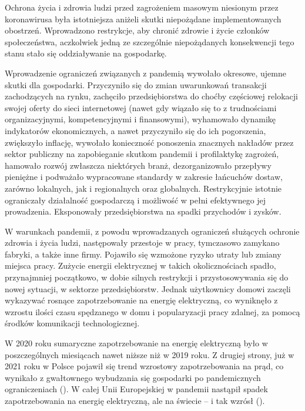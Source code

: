 \documentclass[polish, twoside, 12pt, a4paper]{article}
\theoremstyle{definition}
\theoremstyle{plain}
\theoremstyle{remark}
\begin{document}
Ochrona życia i zdrowia ludzi przed zagrożeniem masowym niesionym przez koronawirusa była istotniejsza aniżeli skutki niepożądane implementowanych obostrzeń. Wprowadzono restrykcje, aby chronić zdrowie i życie członków społeczeństwa, aczkolwiek jedną ze szczególnie niepożądanych konsekwencji tego stanu stało się oddziaływanie na gospodarkę.  

Wprowadzenie ograniczeń związanych z pandemią wywołało okresowe, ujemne skutki dla gospodarki. Przyczyniło się do zmian uwarunkowań transakcji zachodzących na rynku, zachęciło przedsiębiorstwa do choćby częściowej relokacji swojej oferty do sieci internetowej (nawet gdy wiązało się to z trudnościami organizacyjnymi, kompetencyjnymi i finansowymi), wyhamowało dynamikę indykatorów ekonomicznych, a nawet przyczyniło się do ich pogorszenia, zwiększyło inflację, wywołało konieczność ponoszenia znacznych nakładów przez sektor publiczny na zapobieganie skutkom pandemii i profilaktykę zagrożeń, hamowało rozwój zwłaszcza niektórych branż, dezorganizowało przepływy pieniężne i podważało wypracowane standardy w zakresie łańcuchów dostaw, zarówno lokalnych, jak i regionalnych oraz globalnych. Restrykcyjnie istotnie ograniczały działalność gospodarczą i możliwość w pełni efektywnego jej prowadzenia. Eksponowały przedsiębiorstwa na spadki przychodów i zysków. 

W warunkach pandemii, z powodu wprowadzanych ograniczeń służących ochronie zdrowia i życia ludzi, następowały przestoje w pracy, tymczasowo zamykano fabryki, a także inne firmy. Pojawiło się wzmożone ryzyko utraty lub zmiany miejsca pracy. Zużycie energii elektrycznej w takich okolicznościach spadło, przynajmniej początkowo, w dobie silnych restrykcji i przystosowywania się do nowej sytuacji, w sektorze przedsiębiorstw. Jednak użytkownicy domowi zaczęli wykazywać rosnące zapotrzebowanie na energię elektryczną, co wyniknęło z wzrostu ilości czasu spędzanego w domu i popularyzacji pracy zdalnej, za pomocą środków komunikacji technologicznej. 

W 2020 roku sumaryczne zapotrzebowanie na energię elektryczną było w poszczególnych miesiącach nawet niższe niż w 2019 roku. Z drugiej strony, już w 2021 roku w Polsce pojawił się trend wzrostowy zapotrzebowania na prąd, co wynikało z gwałtownego wybudzania się gospodarki po pandemicznych ograniczeniach (\cite{smyk2021}). W całej Unii Europejskiej w pandemii nastąpił spadek zapotrzebowania na energię elektryczną, ale na świecie – i tak wzrósł (\cite{maciuch2023}). 


\clearpage


\end{document}
